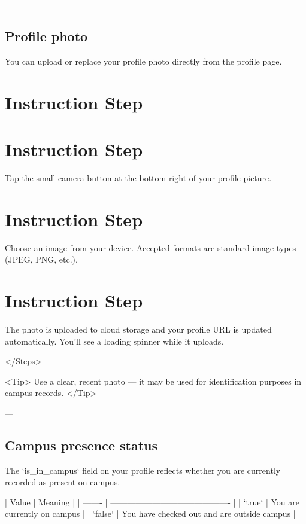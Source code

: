 \begin{tcolorbox}[colback=gray!5,colframe=primary,title=Documentation Note]
---

\subsection{Profile photo}

You can upload or replace your profile photo directly from the profile page.


\section{Instruction Step}

  
\section{Instruction Step}

    Tap the small camera button at the bottom-right of your profile picture.
  
  
\section{Instruction Step}

    Choose an image from your device. Accepted formats are standard image types
    (JPEG, PNG, etc.).
  
  
\section{Instruction Step}

    The photo is uploaded to cloud storage and your profile URL is updated
    automatically. You'll see a loading spinner while it uploads.
  
</Steps>

<Tip>
  Use a clear, recent photo — it may be used for identification purposes in
  campus records.
</Tip>

---

\subsection{Campus presence status}

The `is_in_campus` field on your profile reflects whether you are currently recorded as present on campus.

| Value   | Meaning                                     |
| ------- | ------------------------------------------- |
| `true`  | You are currently on campus                 |
| `false` | You have checked out and are outside campus |


\end{tcolorbox}
